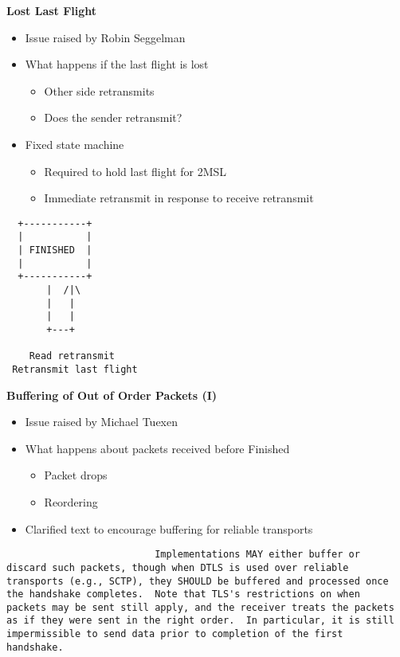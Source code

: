 \documentclass[helvetica]{seminar}
\newcommand{\heading}[1]{%
  \begin{center} 
    \large\bf 
    #1 
  \end{center} 
  \vspace{.4 in}}
\begin{document}
\begin{slide}
\heading{Lost Last Flight}

\begin{minipage}[t]{2.5in}
\begin{itemize}
\item Issue raised by Robin Seggelman
\item What happens if the last flight is lost
\begin{itemize}
\item Other side retransmits
\item Does the sender retransmit?
\end{itemize}
\item Fixed state machine
\begin{itemize}
\item Required to hold last flight for 2MSL
\item Immediate retransmit in response to receive retransmit
\end{itemize}

\end{itemize}
\end{minipage}
\begin{minipage}[t]{1.5in}
\begin{verbatim}
  +-----------+                 
  |           |                 
  | FINISHED  | 
  |           |
  +-----------+
       |  /|\
       |   |
       |   |
       +---+

    Read retransmit
 Retransmit last flight
\end{verbatim}
\end{minipage}
\end{slide}



\begin{slide}
\heading{Buffering of Out of Order Packets (I)}

\vspace{-.2 in}
\begin{itemize}
\item Issue raised by Michael Tuexen
\item What happens about packets received before \textsf{Finished}
\begin{itemize}
\item Packet drops
\item Reordering
\end{itemize}
\item Clarified text to encourage buffering for reliable transports
\end{itemize}

{\small
\begin{verbatim}
                          Implementations MAY either buffer or
discard such packets, though when DTLS is used over reliable
transports (e.g., SCTP), they SHOULD be buffered and processed once
the handshake completes.  Note that TLS's restrictions on when
packets may be sent still apply, and the receiver treats the packets
as if they were sent in the right order.  In particular, it is still
impermissible to send data prior to completion of the first
handshake.
\end{verbatim}
}
\end{slide}
\end{document}
